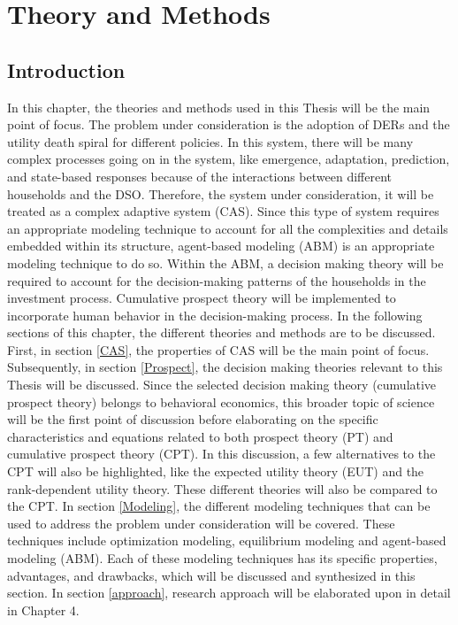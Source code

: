 \chapter{Theory and Methods}
\section{{Introduction}}\label{intro}
\newline \newline \noindent
In this chapter, the theories and methods used in this Thesis will be the main point of focus. The problem under consideration is the adoption of DERs and the utility death spiral for different policies. In this system, there will be many complex processes going on in the system, like emergence, adaptation, prediction, and state-based responses because of the interactions between different households and the DSO. Therefore, the system under consideration, it will be treated as a complex adaptive system (CAS). Since this type of system requires an appropriate modeling technique to account for all the complexities and details embedded within its structure, agent-based modeling (ABM) is an appropriate modeling technique to do so. Within the ABM, a decision making theory will be required to account for the decision-making patterns of the households in the investment process. Cumulative prospect theory will be implemented to incorporate human behavior in the decision-making process.
\newline \newline \noindent
In the following sections of this chapter, the different theories and methods are to be discussed. First, in section \ref{CAS}, the properties of CAS will be the main point of focus. Subsequently, in section \ref{Prospect}, the decision making theories relevant to this Thesis will be discussed. Since the selected decision making theory (cumulative prospect theory) belongs to behavioral economics, this broader topic of science will be the first point of discussion before elaborating on the specific characteristics and equations related to both prospect theory (PT) and cumulative prospect theory (CPT). In this discussion, a few alternatives to the CPT will also be highlighted, like the expected utility theory (EUT) and the rank-dependent utility theory. These different theories will also be compared to the CPT. In section \ref{Modeling}, the different modeling techniques that can be used to address the problem under consideration will be covered. These techniques include optimization modeling, equilibrium modeling and agent-based modeling (ABM). Each of these modeling techniques has its specific properties, advantages, and drawbacks, which will be discussed and synthesized in this section. In section \ref{approach}, research approach will be elaborated upon in detail in Chapter 4.
